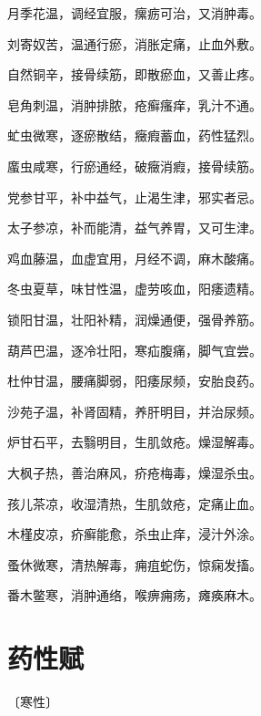 \documentclass[a4paper,12pt,UTF8,twoside]{ctexbook}
\begin{document}
月季花温，调经宜服，瘰疬可治，又消肿毒。

刘寄奴苦，温通行瘀，消胀定痛，止血外敷。

自然铜辛，接骨续筋，即散瘀血，又善止疼。

皂角刺温，消肿排脓，疮癣瘙痒，乳汁不通。

虻虫微寒，逐瘀散结，癥瘕蓄血，药性猛烈。

䗪虫咸寒，行瘀通经，破癥消瘕，接骨续筋。

党参甘平，补中益气，止渴生津，邪实者忌。

太子参凉，补而能清，益气养胃，又可生津。

鸡血藤温，血虚宜用，月经不调，麻木酸痛。

冬虫夏草，味甘性温，虚劳咳血，阳痿遗精。

锁阳甘温，壮阳补精，润燥通便，强骨养筋。

葫芦巴温，逐冷壮阳，寒疝腹痛，脚气宜尝。

杜仲甘温，腰痛脚弱，阳痿尿频，安胎良药。

沙苑子温，补肾固精，养肝明目，并治尿频。

炉甘石平，去翳明目，生肌敛疮。燥湿解毒。

大枫子热，善治麻风，疥疮梅毒，燥湿杀虫。

孩儿茶凉，收湿清热，生肌敛疮，定痛止血。

木槿皮凉，疥癣能愈，杀虫止痒，浸汁外涂。

蚤休微寒，清热解毒，痈疽蛇伤，惊痫发搐。

番木鳖寒，消肿通络，喉痹痈疡，瘫痪麻木。

\chapter{药性赋}

〔寒性〕
\end{document}
